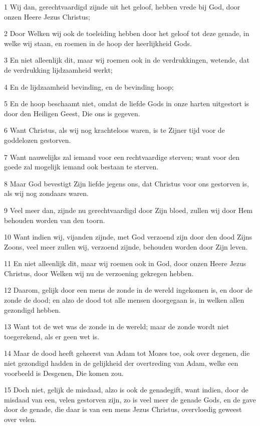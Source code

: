 \par 1 Wij dan, gerechtvaardigd zijnde uit het geloof, hebben vrede bij God, door onzen Heere Jezus Christus;
\par 2 Door Welken wij ook de toeleiding hebben door het geloof tot deze genade, in welke wij staan, en roemen in de hoop der heerlijkheid Gods.
\par 3 En niet alleenlijk dit, maar wij roemen ook in de verdrukkingen, wetende, dat de verdrukking lijdzaamheid werkt;
\par 4 En de lijdzaamheid bevinding, en de bevinding hoop;
\par 5 En de hoop beschaamt niet, omdat de liefde Gods in onze harten uitgestort is door den Heiligen Geest, Die ons is gegeven.
\par 6 Want Christus, als wij nog krachteloos waren, is te Zijner tijd voor de goddelozen gestorven.
\par 7 Want nauwelijks zal iemand voor een rechtvaardige sterven; want voor den goede zal mogelijk iemand ook bestaan te sterven.
\par 8 Maar God bevestigt Zijn liefde jegens ons, dat Christus voor ons gestorven is, als wij nog zondaars waren.
\par 9 Veel meer dan, zijnde nu gerechtvaardigd door Zijn bloed, zullen wij door Hem behouden worden van den toorn.
\par 10 Want indien wij, vijanden zijnde, met God verzoend zijn door den dood Zijns Zoons, veel meer zullen wij, verzoend zijnde, behouden worden door Zijn leven.
\par 11 En niet alleenlijk dit, maar wij roemen ook in God, door onzen Heere Jezus Christus, door Welken wij nu de verzoening gekregen hebben.
\par 12 Daarom, gelijk door een mens de zonde in de wereld ingekomen is, en door de zonde de dood; en alzo de dood tot alle mensen doorgegaan is, in welken allen gezondigd hebben.
\par 13 Want tot de wet was de zonde in de wereld; maar de zonde wordt niet toegerekend, als er geen wet is.
\par 14 Maar de dood heeft geheerst van Adam tot Mozes toe, ook over degenen, die niet gezondigd hadden in de gelijkheid der overtreding van Adam, welke een voorbeeld is Desgenen, Die komen zou.
\par 15 Doch niet, gelijk de misdaad, alzo is ook de genadegift, want indien, door de misdaad van een, velen gestorven zijn, zo is veel meer de genade Gods, en de gave door de genade, die daar is van een mens Jezus Christus, overvloedig geweest over velen.
